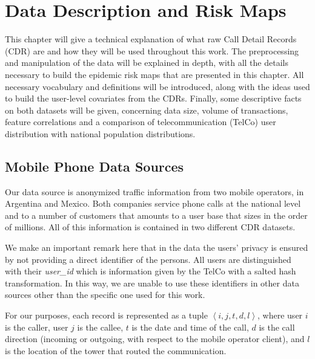 

\chapter{Data Description and Risk Maps}\label{ch:descr-risk}

This chapter will give a technical explanation of what raw Call Detail Records (CDR) are and how they will be used throughout this work.
The preprocessing and manipulation of the data will be explained in depth, with all the details necessary to build the epidemic risk maps that are presented in this chapter.
All necessary vocabulary and definitions will be introduced, along with the ideas used to build the user-level covariates from the CDRs.
Finally, some descriptive facts on both datasets will be given, concerning data size, volume of transactions, feature correlations and a comparison of telecommunication (TelCo) user distribution with national population distributions.


\section{Mobile Phone Data Sources}

Our data source is anonymized traffic information from two mobile operators, in Argentina and Mexico.
Both companies service phone calls at the national level and to a number of customers that amounts to a user base that sizes in the order of millions.
All of this information is contained in two different CDR datasets.

We make an important remark here that in the data the users' privacy is ensured by not providing a direct identifier of the persons.
All users are distinguished with their \textit{user\_id} which is information given by the TelCo with a salted hash transformation.
In this way, we are unable to use these identifiers in other data sources other than the specific one used for this work.

For our purposes, each record is represented as a tuple $\left < i, j, t, d, l \right >$, where user $i$ is the caller, user $j$ is the callee, $t$ is the date and time of the call, $d$ is the call direction (incoming or outgoing, with respect to the mobile operator client), and $l$ is the location of the tower that routed the communication.

